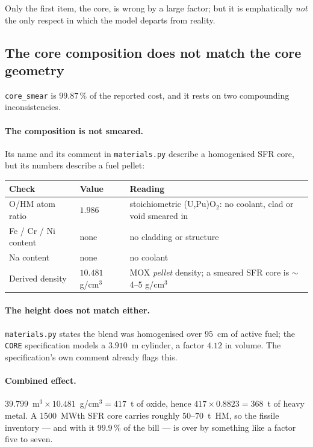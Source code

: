 \documentclass[9pt,a4paper]{extarticle}
\newcommand{\code}[1]{\texttt{\small #1}}
\newcommand{\file}[1]{\texttt{\small #1}}
\begin{document}
Only the first item, the core, is wrong by a large factor; but it is emphatically
\emph{not} the only respect in which the model departs from reality.

\subsection{The core composition does not match the core geometry}
\label{sec:aud:core}

\code{core\_smear} is $99.87\,\%$ of the reported cost, and it rests on two
compounding inconsistencies.

\paragraph{The composition is not smeared.} Its name and its comment in
\file{materials.py} describe a homogenised SFR core, but its numbers describe a
fuel pellet:

\begin{table}[h]
\centering
\footnotesize
\begin{tabular}{@{}llp{7.2cm}@{}}
\toprule
\textbf{Check} & \textbf{Value} & \textbf{Reading} \\
\midrule
O/HM atom ratio      & $1.986$              & stoichiometric (U,Pu)O$_2$: no coolant, clad or void smeared in \\
Fe / Cr / Ni content & none                 & no cladding or structure \\
Na content           & none                 & no coolant \\
Derived density      & $10.481$ g/cm$^3$    & MOX \emph{pellet} density; a smeared SFR core is $\sim$4--5 g/cm$^3$ \\
\bottomrule
\end{tabular}
\end{table}

\paragraph{The height does not match either.} \file{materials.py} states the
blend was homogenised over $95$~cm of active fuel; the \code{CORE} specification
models a $3.910$~m cylinder, a factor $4.12$ in volume. The specification's own
comment already flags this.

\paragraph{Combined effect.} $39.799$~m$^3 \times 10.481$~g/cm$^3 = 417$~t of
oxide, hence $417 \times 0.8823 = 368$~t of heavy metal. A 1500~MWth SFR core
carries roughly $50$--$70$~t~HM, so the fissile inventory --- and with it
$99.9\,\%$ of the bill --- is over by something like a factor five to seven.
\end{document}
